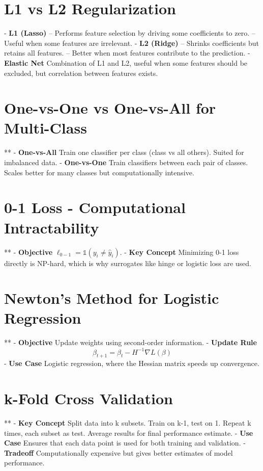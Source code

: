 \documentclass[10pt]{article}
\begin{document}
\begin{multicols}{2}
\section*{L1 vs L2 Regularization}
- \textbf{L1 (Lasso)}
-- Performs feature selection by driving some coefficients to zero.
-- Useful when some features are irrelevant.
- \textbf{L2 (Ridge)}
-- Shrinks coefficients but retains all features.
-- Better when most features contribute to the prediction.
- \textbf{Elastic Net} Combination of L1 and L2, useful when some features should be excluded, but correlation between features exists.

\section*{One-vs-One vs One-vs-All for Multi-Class}**
- \textbf{One-vs-All} Train one classifier per class (class vs all others). Suited for imbalanced data.
- \textbf{One-vs-One} Train classifiers between each pair of classes. Scales better for many classes but computationally intensive.

\section*{0-1 Loss - Computational Intractability}**
- \textbf{Objective} $\ell_{0-1} = \mathbb{1}(y_i \neq \hat{y}_i)$.
- \textbf{Key Concept} Minimizing 0-1 loss directly is NP-hard, which is why surrogates like hinge or logistic loss are used.

\section*{Newton's Method for Logistic Regression}**
- \textbf{Objective} Update weights using second-order information.
- \textbf{Update Rule} 
  \[
  \beta_{t+1} = \beta_t - H^{-1} \nabla L(\beta)
  \]
- \textbf{Use Case} Logistic regression, where the Hessian matrix speeds up convergence.

\section*{k-Fold Cross Validation}**
- \textbf{Key Concept} Split data into k subsets. Train on k-1, test on 1. Repeat k times, each subset as test. Average results for final performance estimate.
- \textbf{Use Case} Ensures that each data point is used for both training and validation.
- \textbf{Tradeoff} Computationally expensive but gives better estimates of model performance.



\end{multicols}
\end{document}
